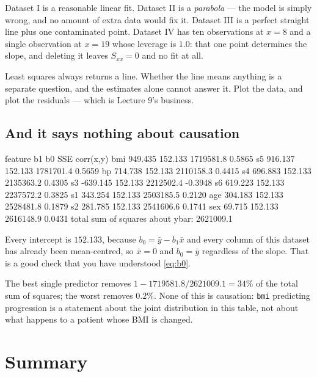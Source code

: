 \documentclass[11pt]{article}
\begin{document}
Dataset I is a reasonable linear fit. Dataset II is a \emph{parabola} --- the
model is simply wrong, and no amount of extra data would fix it. Dataset III
is a perfect straight line plus one contaminated point. Dataset IV has ten
observations at $x=8$ and a single observation at $x=19$ whose leverage is
$1.0$: that one point determines the slope, and deleting it leaves $S_{xx}=0$
and no fit at all.

\begin{keyidea}
Least squares always returns a line. Whether the line means anything is a
separate question, and the estimates alone cannot answer it. Plot the data,
and plot the residuals --- which is Lecture 9's business.
\end{keyidea}

\subsection{And it says nothing about causation}

\begin{codeout}
feature        b1        b0        SSE      corr(x,y)
bmi         949.435   152.133   1719581.8      0.5865
s5          916.137   152.133   1781701.4      0.5659
bp          714.738   152.133   2110158.3      0.4415
s4          696.883   152.133   2135363.2      0.4305
s3         -639.145   152.133   2212502.4     -0.3948
s6          619.223   152.133   2237572.2      0.3825
s1          343.254   152.133   2503185.5      0.2120
age         304.183   152.133   2528481.8      0.1879
s2          281.785   152.133   2541606.6      0.1741
sex          69.715   152.133   2616148.9      0.0431
total sum of squares about ybar: 2621009.1
\end{codeout}

Every intercept is $152.133$, because $b_0 = \bar y - b_1\bar x$ and every
column of this dataset has already been mean-centred, so $\bar x = 0$ and
$b_0 = \bar y$ regardless of the slope. That is a good check that you have
understood \eqref{eq:b0}.

The best single predictor removes $1 - 1719581.8/2621009.1 = 34\%$ of the
total sum of squares; the worst removes $0.2\%$. None of this is causation:
\texttt{bmi} predicting progression is a statement about the joint
distribution in this table, not about what happens to a patient whose BMI is
changed.

\section{Summary}
\label{sec:summary}
\end{document}
